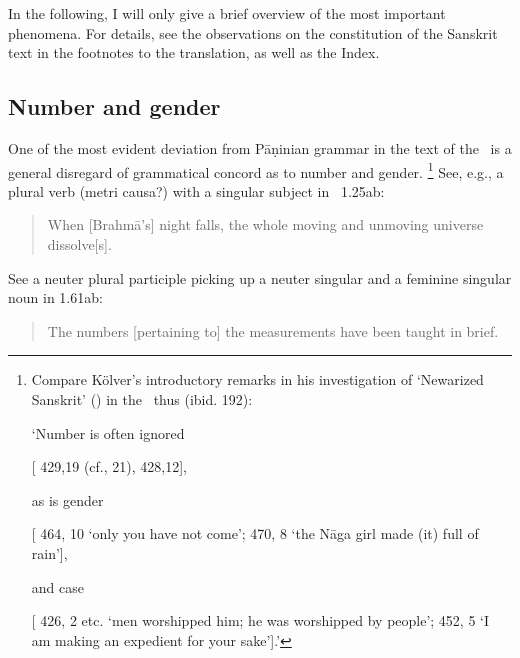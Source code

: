 In the following, I will only give a brief overview of the most
important phenomena. For details, see the observations 
on the constitution of the Sanskrit text in the footnotes 
to the translation, as well as the Index.


\subsection{Number and gender}\label{number}
One of the most evident deviation from Pāṇinian grammar in 
the text of the \VSS\ is a general disregard of grammatical concord 
as to number and gender.%
	\footnote{Compare Kölver's introductory remarks in
				   his investigation of `Newarized Sanskrit' ()
					in the \SvayP\ thus (ibid. 192):
					
					\noindent
	          	`Number is often ignored
	          	
					[ 429,19 (cf., 21), 
					 428,12],
					
					\noindent
					as is gender
					
			[ 464, 10 `only you have not come’; 
			 470, 8 
					`the Nāga girl made (it) full of rain'],
				
				\noindent
				and case
				
				[ 426, 2 etc. 
				`men worshipped him; he was worshipped by people'; 
				 452, 5 
				`I am making an expedient for your sake'].'}
See, e.g., a plural verb
(metri causa?) with a singular subject in \VSS\ 1.25ab:

\begin{quote}

When [Brahmā's] night falls, the whole moving and unmoving universe dissolve[s].
\end{quote}

\noindent
See a neuter plural participle picking up a 
neuter singular and a feminine singular noun in 1.61ab:

\begin{quote}

The numbers [pertaining to] the measurements have been taught in brief.
\end{quote}


